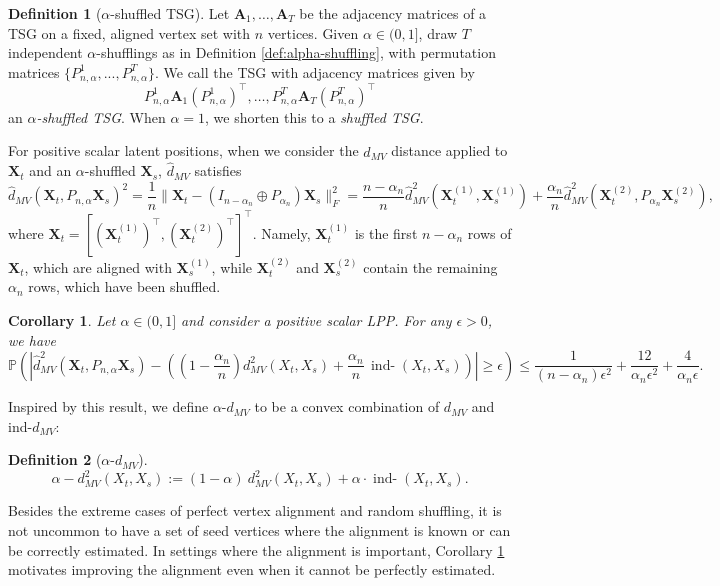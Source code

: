 \documentclass[12pt]{article}
\newtheorem{corollary}{Corollary}
\theoremstyle{definition}
\newtheorem{definition}{Definition}
\newcommand{\bA}{\mathbf{A}}
\newcommand{\bX}{\mathbf{X}}
\newcommand{\inddmv}[1][]{\mathop{\mbox{ind-$d_{MV}^{#1}$}}}
\begin{document}
\begin{definition}[$\alpha$-shuffled TSG]
\label{def:alpha-shuffled-tsg}
Let $\bA_1,\ldots,\bA_T$ be the adjacency matrices of a TSG on a fixed, aligned vertex set with $n$ vertices. Given $\alpha\in(0,1]$, draw $T$ independent $\alpha$-shufflings as in Definition \ref{def:alpha-shuffling}, with permutation matrices $\{P^1_{n, \alpha},...,P^T_{n, \alpha}\}$.
We call the TSG with adjacency matrices given by 
$$P^1_{n, \alpha} \bA_1 (P^1_{n, \alpha})^\top ,\ldots,  P^T_{n, \alpha} \bA_T (P^T_{n, \alpha})^\top$$ an $\alpha$\emph{-shuffled TSG}. When $\alpha = 1$, we shorten this to a \emph{shuffled TSG}.
\end{definition}
For positive scalar latent positions, when we consider the $\hat{d}_{MV}$ distance applied to $\bX_t$ and an $\alpha$-shuffled $\bX_s$, $\hat{d}_{MV}$ satisfies
\begin{equation}\label{equ:decompose_partial_shuffling}
\hat{d}_{MV}(\bX_t,P_{n,\alpha}\bX_s)^2= \frac{1}{n}\| \bX_t - (I_{n - \alpha_n} \oplus P_{\alpha_n} )   \bX_{s}\|^2_F 
= \frac{n - \alpha_n}{n} \hat{d}^2_{MV}(\bX_t^{(1)},\bX^{(1)}_s) + \frac{\alpha_n}{n}\hat{d}^2_{MV}( \bX_t^{(2)} , P_{\alpha_n} \bX_s^{(2)} ),
\end{equation}
where $\bX_t = [(\bX_t^{(1)})^\top, (\bX_t^{(2)})^\top]^\top$. Namely, $\bX_t^{(1)}$ is the first $n-\alpha_n$ rows of $\bX_t$, which are aligned with $\bX_s^{(1)}$, while $\bX_t^{(2)}$ and $\bX_s^{(2)}$ contain the remaining $\alpha_n$ rows, which have been shuffled. 
\begin{corollary}\label{Cor:partial shuffling}
Let $\alpha\in(0,1]$ and consider a positive scalar LPP. 
For any $\epsilon > 0$, we have 
$$ \mathbb{P} \left( \left| \hat{d}^2_{MV}(\mathbf{X}_{t}, P_{n,\alpha} \mathbf{X}_{s})-  
\left( \left(1-\frac{\alpha_n}{n}\right) d^2_{MV}(X_{t},X_{s}) +  \frac{\alpha_n}{n}\, \inddmv[2](X_{t}, X_{s})\right)
\right| \geq \epsilon \right) \leq  \frac{1}{(n-\alpha_n) \epsilon^2} + \frac{12}{\alpha_n \epsilon^2} + \frac{4}{\alpha_n \epsilon}.$$
\end{corollary}

Inspired by this result, we define $\alpha$-$d_{MV}$ to be a convex combination of $d_{MV}$ and ind-$d_{MV}$:
\begin{definition}[$\alpha$-$d_{MV}$]
$$
\alpha-d^2_{MV}(X_t,X_s) := (1-\alpha) ~ d^2_{MV}(X_t,X_s) + \alpha\cdot \inddmv[2](X_t,X_s). 
$$    
\end{definition}

Besides the extreme cases of perfect vertex alignment and random shuffling, it is not uncommon to have a set of seed vertices where the alignment is known or can be correctly estimated. 
In settings where the alignment is important, Corollary \ref{Cor:partial shuffling} motivates improving the alignment even when it cannot be perfectly estimated.
\end{document}
